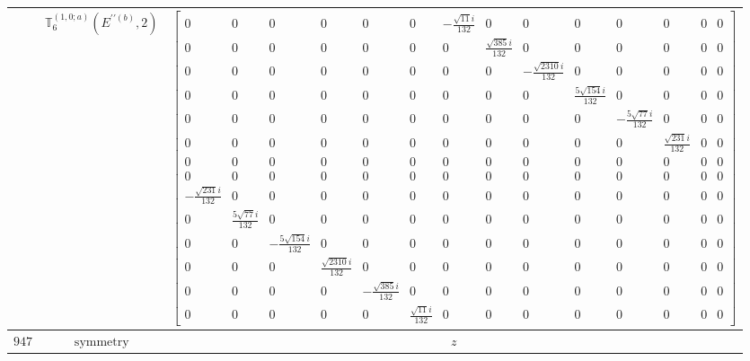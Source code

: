 \documentclass[fleqn,8pt,landscape]{jsarticle}
\begin{document}
\begin{longtable}{ccc}
$  $ & $ \mathbb{T}_{6}^{(1,0;a)}(E^{\prime\prime(b)},2) $ & $ \begin{bmatrix} 0 & 0 & 0 & 0 & 0 & 0 & - \frac{\sqrt{11} i}{132} & 0 & 0 & 0 & 0 & 0 & 0 & 0 \\ 0 & 0 & 0 & 0 & 0 & 0 & 0 & \frac{\sqrt{385} i}{132} & 0 & 0 & 0 & 0 & 0 & 0 \\ 0 & 0 & 0 & 0 & 0 & 0 & 0 & 0 & - \frac{\sqrt{2310} i}{132} & 0 & 0 & 0 & 0 & 0 \\ 0 & 0 & 0 & 0 & 0 & 0 & 0 & 0 & 0 & \frac{5 \sqrt{154} i}{132} & 0 & 0 & 0 & 0 \\ 0 & 0 & 0 & 0 & 0 & 0 & 0 & 0 & 0 & 0 & - \frac{5 \sqrt{77} i}{132} & 0 & 0 & 0 \\ 0 & 0 & 0 & 0 & 0 & 0 & 0 & 0 & 0 & 0 & 0 & \frac{\sqrt{231} i}{132} & 0 & 0 \\ 0 & 0 & 0 & 0 & 0 & 0 & 0 & 0 & 0 & 0 & 0 & 0 & 0 & 0 \\ 0 & 0 & 0 & 0 & 0 & 0 & 0 & 0 & 0 & 0 & 0 & 0 & 0 & 0 \\ - \frac{\sqrt{231} i}{132} & 0 & 0 & 0 & 0 & 0 & 0 & 0 & 0 & 0 & 0 & 0 & 0 & 0 \\ 0 & \frac{5 \sqrt{77} i}{132} & 0 & 0 & 0 & 0 & 0 & 0 & 0 & 0 & 0 & 0 & 0 & 0 \\ 0 & 0 & - \frac{5 \sqrt{154} i}{132} & 0 & 0 & 0 & 0 & 0 & 0 & 0 & 0 & 0 & 0 & 0 \\ 0 & 0 & 0 & \frac{\sqrt{2310} i}{132} & 0 & 0 & 0 & 0 & 0 & 0 & 0 & 0 & 0 & 0 \\ 0 & 0 & 0 & 0 & - \frac{\sqrt{385} i}{132} & 0 & 0 & 0 & 0 & 0 & 0 & 0 & 0 & 0 \\ 0 & 0 & 0 & 0 & 0 & \frac{\sqrt{11} i}{132} & 0 & 0 & 0 & 0 & 0 & 0 & 0 & 0 \end{bmatrix} $ \\ \hline
$ 947 $ & $ \text{symmetry} $ & $ z $ \\

\end{longtable}
\end{document}
